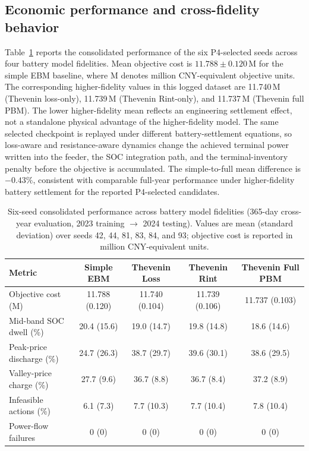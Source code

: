 \subsection{Economic performance and cross-fidelity behavior}

Table~\ref{tab:six_seed_performance} reports the consolidated performance of the six P4-selected seeds across four battery model fidelities. Mean objective cost is $11.788 \pm 0.120$\,M\textyen{} for the simple EBM baseline, where M\textyen{} denotes million CNY-equivalent objective units. The corresponding higher-fidelity values in this logged dataset are 11.740\,M\textyen{} (Thevenin loss-only), 11.739\,M\textyen{} (Thevenin Rint-only), and 11.737\,M\textyen{} (Thevenin full PBM). The lower higher-fidelity mean reflects an engineering settlement effect, not a standalone physical advantage of the higher-fidelity model. The same selected checkpoint is replayed under different battery-settlement equations, so loss-aware and resistance-aware dynamics change the achieved terminal power written into the feeder, the SOC integration path, and the terminal-inventory penalty before the objective is accumulated. The simple-to-full mean difference is $-0.43\%$, consistent with comparable full-year performance under higher-fidelity battery settlement for the reported P4-selected candidates.

\begin{table}[!t]
\centering
\footnotesize
\setlength{\tabcolsep}{6pt}
\renewcommand{\arraystretch}{1.12}
\caption{Six-seed consolidated performance across battery model fidelities (365-day cross-year evaluation, 2023 training $\to$ 2024 testing). Values are mean (standard deviation) over seeds 42, 44, 81, 83, 84, and 93; objective cost is reported in million CNY-equivalent units.}
\label{tab:six_seed_performance}
\begin{tabular}{lcccc}
\toprule
Metric & Simple EBM & Thevenin Loss & Thevenin Rint & Thevenin Full PBM \\
\midrule
Objective cost (M\textyen{}) & 11.788 (0.120) & 11.740 (0.104) & 11.739 (0.106) & 11.737 (0.103) \\
Mid-band SOC dwell (\%) & 20.4 (15.6) & 19.0 (14.7) & 19.8 (14.8) & 18.6 (14.6) \\
Peak-price discharge (\%) & 24.7 (26.3) & 38.7 (29.7) & 39.6 (30.1) & 38.6 (29.5) \\
Valley-price charge (\%) & 27.7 (9.6) & 36.7 (8.8) & 36.7 (8.4) & 37.2 (8.9) \\
Infeasible actions (\%) & 6.1 (7.3) & 7.7 (10.3) & 7.7 (10.4) & 7.8 (10.4) \\
Power-flow failures & 0 (0) & 0 (0) & 0 (0) & 0 (0) \\
\bottomrule
\end{tabular}
\end{table}


